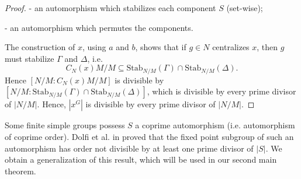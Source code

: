 \documentclass[11pt, a4paper]{article}
\numberwithin{equation}{section}
\theoremstyle{plain} %
\begin{document}
\begin{proof}
- an automorphism which stabilizes each component $S$ (set-wise); 

- an automorphism which permutes the components. 


The construction of $x$, using $a$ and $b$, shows that if $g\in N$ centralizes $x$, then $g$ must stabilize $\Gamma$ and $\Delta$, i.e. 
$$
C_{N}(x)M/M \subseteq \mathrm{Stab}_{N/M}(\Gamma)\cap \mathrm{Stab}_{N/M}(\Delta).
$$ 
Hence $[N/M:C_{N}(x)M/M]$ is divisible by $[N/M:\mathrm{Stab}_{N/M}(\Gamma)\cap \mathrm{Stab}_{N/M}(\Delta)]$, which is divisible by every prime divisor of $|N/M|$. Hence, $|x^G|$ is divisible by every prime divisor of $|N/M|$. \end{proof}

\vskip5mm
Some finite simple groups possess $S$ a coprime automorphism (i.e. automorphism of coprime order). Dolfi et al. in \cite{MR2469367} proved that the fixed point subgroup of such an automorphism has order not divisible by at least one prime divisor of $|S|$. We obtain a generalization of this result, which will be used in our second main theorem.  
\end{document}
